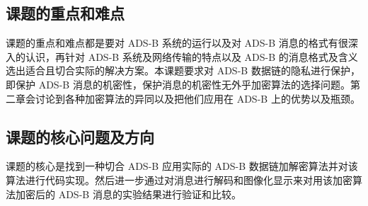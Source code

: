\subsection{课题的重点和难点}
课题的重点和难点都是要对 ADS-B 系统的运行以及对 ADS-B 消息的格式有很深入的认识，再针对 ADS-B 系统及网络传输的特点以及 ADS-B 的消息格式及含义选出适合且切合实际的解决方案。本课题要求对     ADS-B 数据链的隐私进行保护，即保护 ADS-B 消息的机密性，保护消息的机密性无外乎加密算法的选择问题。第二章会讨论到各种加密算法的异同以及把他们应用在 ADS-B 上的优势以及瓶颈。
\subsection{课题的核心问题及方向}
课题的核心是找到一种切合 ADS-B 应用实际的 ADS-B 数据链加解密算法并对该算法进行代码实现。然后进一步通过对消息进行解码和图像化显示来对用该加密算法加密后的 ADS-B 消息的实验结果进行验证和比较。
